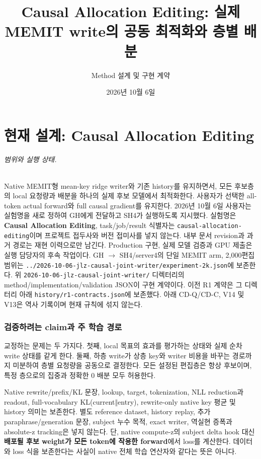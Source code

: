 \documentclass[11pt]{article}
\title{Causal Allocation Editing: 실제 MEMIT write의 공동 최적화와 층별 배분}
\author{Method 설계 및 구현 계약}
\date{2026년 10월 6일}
\begin{document}
\maketitle

\part*{현재 설계: Causal Allocation Editing}
\paragraph{범위와 실행 상태.}
Native MEMIT형 mean-key ridge writer와 기존 history를 유지하면서,
모든 후보층의 local 요청량과 배분을 하나의 실제 후보 모델에서 최적화한다.
사용자가 선택한 all-token actual forward와 full causal gradient를 유지한다.
2026년 10월 6일 사용자는 실험명을 새로 정하여 GH에게 전달하고
SH4가 실행하도록 지시했다. 실험명은 \textbf{Causal Allocation Editing},
task/job/result 식별자는 \texttt{causal-allocation-editing}이며 프로젝트 접두사와
버전 접미사를 넣지 않는다. 내부 문서 revision과 과거 경로는 재현 이력으로만 남긴다.
Production 구현, 실제 모델 검증과 GPU 제출은 실행 담당자의 후속 작업이다.
GH $\to$ SH4/server4의 단일 MEMIT arm, 2,000편집 범위는
\texttt{../2026-10-06-jlz-causal-joint-writer/experiment-2k.json}에 보존한다.
위 \texttt{2026-10-06-jlz-causal-joint-writer/} 디렉터리의
method/implementation/validation JSON이 구현 계약이다.
이전 R1 계약은 그 디렉터리 아래 \texttt{history/r1-contracts.json}에 보존했다.
아래 CD-Q/CD-C, V14 및 V13은 역사 기록이며 현재 규칙에 섞지 않는다.

\section{검증하려는 claim과 주 학습 경로}
교정하는 문제는 두 가지다.
첫째, local 목표의 효과를 평가하는 상태와 실제 순차 write 상태를 같게 한다.
둘째, 하층 write가 상층 key와 writer 비용을 바꾸는 경로까지 미분하여
층별 요청량을 공동으로 결정한다. 모든 설정된 편집층은 항상 후보이며,
특정 층으로의 집중과 정확한 0 배분 모두 허용한다.

Native rewrite/prefix/KL 문장, lookup, target, tokenization,
NLL reduction과 readout, full-vocabulary KL(current$\Vert$entry),
rewrite-only native key 평균 및 history 의미는 보존한다.
별도 reference dataset, history replay, 추가 paraphrase/generation 문장,
subject 누수 목적, exact writer, 역실현 증폭과 absolute-z tracking은 넣지 않는다.
단, native compute-z의 subject delta hook 대신
\textbf{배포될 후보 weight가 모든 token에 작용한 forward}에서 loss를 계산한다.
데이터와 loss 식을 보존한다는 사실이 native 전체 학습 연산자와 같다는 뜻은 아니다.
\end{document}
